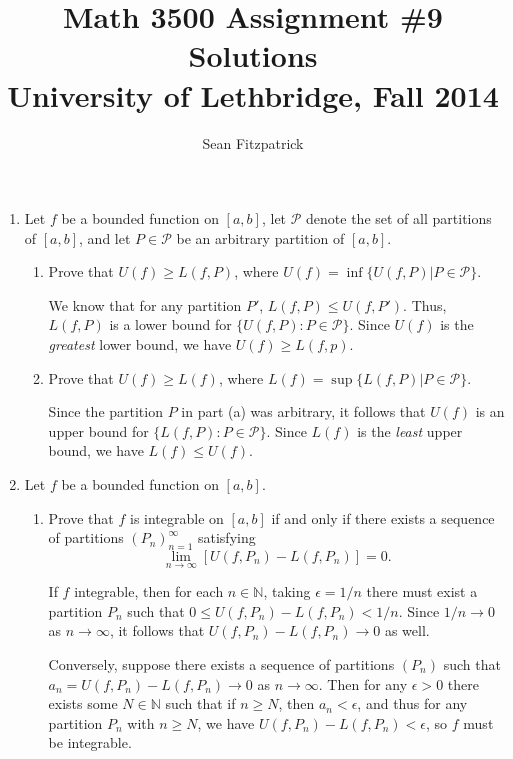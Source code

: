 \documentclass[letterpaper,12pt]{article}
\title{Math 3500 Assignment \#9 Solutions\\University of Lethbridge, Fall 2014}
\author{Sean Fitzpatrick}
\newcommand{\N}{\mathbb{N}}
\begin{document}
 \maketitle


\begin{enumerate}
 \item Let $f$ be a bounded function on $[a,b]$, let $\mathcal{P}$ denote the set of all partitions of $[a,b]$, and let $P\in \mathcal{P}$ be an arbitrary partition of $[a,b]$.
\begin{enumerate}
 \item Prove that $U(f)\geq L(f,P)$, where $U(f) = \inf\{U(f,P) | P\in\mathcal{P}\}$.

\bigskip

We know that for any partition $P'$, $L(f,P)\leq U(f,P')$. Thus, $L(f,P)$ is a lower bound for $\{U(f,P): P\in \mathcal{P}\}$. Since $U(f)$ is the {\em greatest} lower bound, we have $U(f)\geq L(f,p)$.

\bigskip

 \item Prove that $U(f)\geq L(f)$, where $L(f)=\sup\{L(f,P) | P\in\mathcal{P}\}$.

\bigskip

Since the partition $P$ in part (a) was arbitrary, it follows that $U(f)$ is an upper bound for $\{L(f,P):P\in \mathcal{P}\}$. Since $L(f)$ is the {\em least} upper bound, we have $L(f)\leq U(f)$.

\bigskip

\end{enumerate}
 \item Let $f$ be a bounded function on $[a,b]$.
\begin{enumerate}
 \item Prove that $f$ is integrable on $[a,b]$ if and only if there exists a sequence of partitions $(P_n)_{n=1}^\infty$ satisfying
\[
 \lim_{n\to\infty}[U(f,P_n)-L(f,P_n)]=0.
\]

\bigskip

If $f$ integrable, then for each $n\in \N$, taking $\epsilon=1/n$ there must exist a partition $P_n$ such that $0\leq U(f,P_n)-L(f,P_n)<1/n$. Since $1/n\to 0$ as $n\to \infty$, it follows that $U(f,P_n)-L(f,P_n)\to 0$ as well.

Conversely, suppose there exists a sequence of partitions $(P_n)$ such that $a_n = U(f,P_n)-L(f,P_n)\to 0$ as $n\to \infty$. Then for any $\epsilon>0$ there exists some $N\in \N$ such that if $n\geq N$, then $a_n<\epsilon$, and thus for any partition $P_n$ with $n\geq N$, we have $U(f,P_n)-L(f,P_n)<\epsilon$, so $f$ must be integrable.


\end{enumerate}
\end{enumerate}
\end{document}
